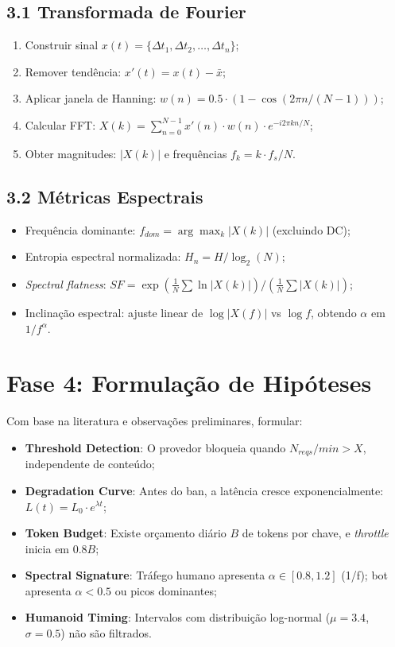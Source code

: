 \documentclass[12pt,openright,oneside,a4paper]{abntex2}
\begin{document}
\subsection{3.1 Transformada de Fourier}
\begin{enumerate}
    \item Construir sinal $x(t) = \{\Delta t_1, \Delta t_2, \ldots, \Delta t_n\}$;
    \item Remover tendência: $x'(t) = x(t) - \bar{x}$;
    \item Aplicar janela de Hanning: $w(n) = 0.5 \cdot (1 - \cos(2\pi n / (N-1)))$;
    \item Calcular FFT: $X(k) = \sum_{n=0}^{N-1} x'(n) \cdot w(n) \cdot e^{-i2\pi kn/N}$;
    \item Obter magnitudes: $|X(k)|$ e frequências $f_k = k \cdot f_s / N$.
\end{enumerate}

\subsection{3.2 Métricas Espectrais}
\begin{itemize}
    \item Frequência dominante: $f_{dom} = \arg\max_k |X(k)|$ (excluindo DC);
    \item Entropia espectral normalizada: $H_n = H / \log_2(N)$;
    \item \textit{Spectral flatness}: $SF = \exp(\frac{1}{N}\sum \ln|X(k)|) / (\frac{1}{N}\sum |X(k)|)$;
    \item Inclinação espectral: ajuste linear de $\log|X(f)|$ vs $\log f$, obtendo $\alpha$ em $1/f^{\alpha}$.
\end{itemize}

\section{Fase 4: Formulação de Hipóteses}

Com base na literatura e observações preliminares, formular:

\begin{itemize}
    \item[H1] \textbf{Threshold Detection}: O provedor bloqueia quando $N_{reqs}/min > X$, independente de conteúdo;
    \item[H2] \textbf{Degradation Curve}: Antes do ban, a latência cresce exponencialmente: $L(t) = L_0 \cdot e^{\lambda t}$;
    \item[H3] \textbf{Token Budget}: Existe orçamento diário $B$ de tokens por chave, e \textit{throttle} inicia em $0.8B$;
    \item[H4] \textbf{Spectral Signature}: Tráfego humano apresenta $\alpha \in [0.8, 1.2]$ (1/f); bot apresenta $\alpha < 0.5$ ou picos dominantes;
    \item[H5] \textbf{Humanoid Timing}: Intervalos com distribuição log-normal ($\mu = 3.4$, $\sigma = 0.5$) não são filtrados.
\end{itemize}
\end{document}
